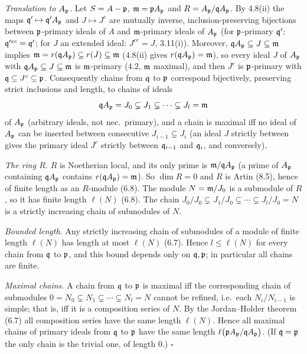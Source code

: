 \documentclass[11pt]{article}
\begin{document}
\emph{Translation to $A_\mathfrak p$.} Let $S=A-\mathfrak p$, $\mathfrak m=\mathfrak p A_\mathfrak p$ and $R=A_\mathfrak p/\mathfrak q A_\mathfrak p$. By 4.8(ii) the maps $\mathfrak q'\mapsto\mathfrak q'A_\mathfrak p$ and $J\mapsto J^c$ are mutually inverse, inclusion-preserving bijections between $\mathfrak p$-primary ideals of $A$ and $\mathfrak m$-primary ideals of $A_\mathfrak p$ (for $\mathfrak p$-primary $\mathfrak q'$: $\mathfrak q'^{ec}=\mathfrak q'$; for $J$ an extended ideal: $J^{ce}=J$, 3.11(i)). Moreover, $\mathfrak q A_\mathfrak p\subseteq J\subseteq\mathfrak m$ implies $\mathfrak m=r(\mathfrak q A_\mathfrak p)\subseteq r(J)\subseteq\mathfrak m$ (4.8(ii) gives $r(\mathfrak q A_\mathfrak p)=\mathfrak m$), so every ideal $J$ of $A_\mathfrak p$ with $\mathfrak q A_\mathfrak p\subseteq J\subseteq\mathfrak m$ is $\mathfrak m$-primary (4.2, $\mathfrak m$ maximal), and then $J^c$ is $\mathfrak p$-primary with $\mathfrak q\subseteq J^c\subseteq\mathfrak p$. Consequently chains from $\mathfrak q$ to $\mathfrak p$ correspond bijectively, preserving strict inclusions and length, to chains of ideals
\[
\mathfrak q A_\mathfrak p=J_0\subsetneq J_1\subsetneq\cdots\subsetneq J_l=\mathfrak m
\]
of $A_\mathfrak p$ (arbitrary ideals, not nec.\ primary), and a chain is maximal iff no ideal of $A_\mathfrak p$ can be inserted between consecutive $J_{i-1}\subsetneq J_i$ (an ideal $J$ strictly between gives the primary ideal $J^c$ strictly between $\mathfrak q_{i-1}$ and $\mathfrak q_i$, and conversely).

\emph{The ring $R$.} $R$ is Noetherian local, and its only prime is $\mathfrak m/\mathfrak q A_\mathfrak p$ (a prime of $A_\mathfrak p$ containing $\mathfrak q A_\mathfrak p$ contains $r(\mathfrak q A_\mathfrak p)=\mathfrak m$). So $\dim R=0$ and $R$ is Artin (8.5), hence of finite length as an $R$-module (6.8). The module $N=\mathfrak m/J_0$ is a submodule of $R$, so it has finite length $\ell(N)$ (6.8). The chain $J_0/J_0\subsetneq J_1/J_0\subsetneq\cdots\subsetneq J_l/J_0=N$ is a strictly increasing chain of submodules of $N$.

\emph{Bounded length.} Any strictly increasing chain of submodules of a module of finite length $\ell(N)$ has length at most $\ell(N)$ (6.7). Hence $l\le\ell(N)$ for every chain from $\mathfrak q$ to $\mathfrak p$, and this bound depends only on $\mathfrak q,\mathfrak p$; in particular all chains are finite.

\emph{Maximal chains.} A chain from $\mathfrak q$ to $\mathfrak p$ is maximal iff the corresponding chain of submodules $0=N_0\subsetneq N_1\subsetneq\cdots\subsetneq N_l=N$ cannot be refined, i.e.\ each $N_i/N_{i-1}$ is simple; that is, iff it is a composition series of $N$. By the Jordan--Holder theorem (6.7) all composition series have the same length $\ell(N)$. Hence all maximal chains of primary ideals from $\mathfrak q$ to $\mathfrak p$ have the same length $\ell\bigl(\mathfrak p A_\mathfrak p/\mathfrak q A_\mathfrak p\bigr)$. (If $\mathfrak q=\mathfrak p$ the only chain is the trivial one, of length $0$.) \hfill$\square$
\end{document}

